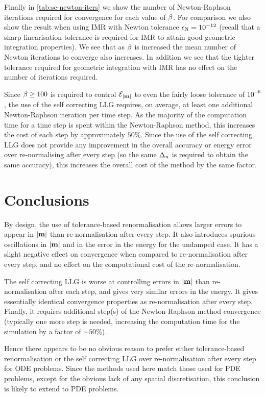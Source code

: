 Finally in \cref{tab:sc-newton-iters} we show the number of Newton-Raphson iterations required for convergence for each value of $\beta$.
For comparison we also show the result when using IMR with Newton tolerance $\epsilon_{\mathrm{N}}=10^{-12}$ (recall that a sharp linearisation tolerance is required for IMR to attain good geometric integration properties).
We see that as $\beta$ is increased the mean number of Newton iterations to converge also increases.
In addition we see that the tighter tolerance required for geometric integration with IMR has no effect on the number of iterations required.

Since $\beta \geq 100$ is required to control $\mathcal{E}_{\left|{\boldsymbol{\mathrm{m}}} \right|}$ to even the fairly loose tolerance of $10^{-6}$, the use of the self correcting LLG requires, on average, at least one additional Newton-Raphson iteration per time step.
As the majority of the computation time for a time step is spent within the Newton-Raphson method, this increases the cost of each step by approximately $50\%$.
Since the use of the self correcting LLG does not provide any improvement in the overall accuracy or energy error over re-normalising after every step (so the same $\Delta_{n}$ is required to obtain the same accuracy), this increases the overall cost of the method by the same factor.


\section{Conclusions}

By design, the use of tolerance-based renormalisation allows larger errors to appear in $\left|{\boldsymbol{\mathrm{m}}} \right|$ than re-normalisation after every step.
It also introduces spurious oscillations in $\left|{\boldsymbol{\mathrm{m}}} \right|$ and in the error in the energy for the undamped case.
It has a slight negative effect on convergence when compared to re-normalisation after every step, and no effect on the computational cost of the re-normalisation.

The self correcting LLG is worse at controlling errors in $\left|{\boldsymbol{\mathrm{m}}} \right|$ than re-normalisation after each step, and gives very similar errors in the energy.
It gives essentially identical convergence properties as re-normalisation after every step.
Finally, it requires additional step(s) of the Newton-Raphson method convergence (typically one more step is needed, increasing the computation time for the simulation by a factor of $\sim 50\%$).

Hence there appears to be no obvious reason to prefer either tolerance-based renormalisation or the self correcting LLG over re-normalisation after every step for ODE problems.
Since the methods used here match those used for PDE problems, except for the obvious lack of any spatial discretisation, this conclusion is likely to extend to PDE problems.


